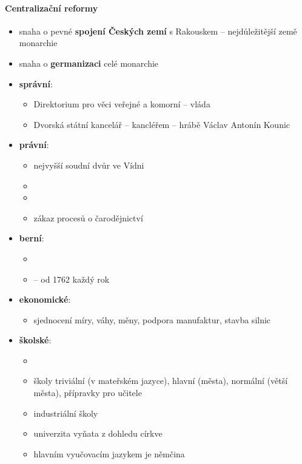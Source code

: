 \paragraph{Centralizační reformy}
\begin{itemize}
\item snaha o pevné \textbf{spojení Českých zemí} s Rakouskem -- nejdůležitější země monarchie
\item snaha o \textbf{germanizaci} celé monarchie
\item \textbf{správní}:
	\begin{itemize}
	\item Direktorium pro věci veřejné a komorní -- vláda
	\item Dvorská státní kancelář -- kancléřem -- hrábě Václav Antonín Kounic
	\end{itemize}
\item \textbf{právní}:
	\begin{itemize}
	\item nejvyšší soudní dvůr ve Vídni
	\item {}
	\item {}
	\item zákaz procesů o čarodějnictví
	\end{itemize}
\item \textbf{berní}:
	\begin{itemize}
	\item {}
	\item {}  -- od 1762 každý rok
	\end{itemize}
\item \textbf{ekonomické}:
	\begin{itemize}
	\item sjednocení míry, váhy, měny, podpora manufaktur, stavba silnic
	\end{itemize}
\item \textbf{školské}:
	\begin{itemize}
	\item {}
	\item školy triviální (v mateřském jazyce), hlavní (města), normální (větší města), přípravky pro učitele 
	\item industriální školy
	\item univerzita vyňata z dohledu církve
	\item hlavním vyučovacím jazykem je němčina
	\end{itemize}

\end{itemize}
